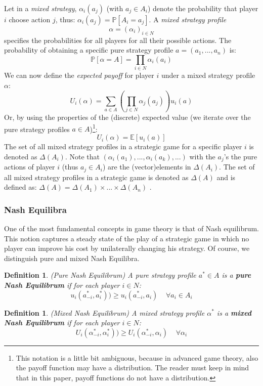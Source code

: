 \documentclass[a4paper,11pt]{article}
\newtheorem{definition}[theorem]{Definition}
\renewcommand{\P}{{\mathbb P}}
\newcommand{\E}{{\mathbb E}}
\begin{document}
Let in a \emph{mixed strategy}, $\alpha_i(a_j)$ (with $a_j \in A_i$) denote the probability that player $i$ choose action $j$, thus: $\alpha_i(a_j) = \P[A_i = a_j]$. A \emph{mixed strategy profile} $$\alpha = \left(\alpha_i\right)_{i\in N}$$ specifies the probabilities for all players for all their possible actions. The probability of obtaining a specific pure strategy profile $a = (a_1,...,a_n)$ is:
$$\P[\alpha = A] = \displaystyle\prod_{i \in N} \alpha_i(a_i)$$
 We can now define the \emph{expected payoff} for player $i$ under a mixed strategy profile $\alpha$:
$$U_i(\alpha) = \displaystyle\sum_{a \in A}{\left(\prod_{j \in N}{\alpha_j(a_j)}\right) u_i(a)}$$
Or, by using the properties of the (discrete) expected value (we iterate over the pure strategy profiles $a \in A$)\footnote[1]{This notation is a little bit ambiguous, because in advanced game theory, also the payoff function may have a distribution. The reader must keep in mind that in this paper, payoff functions do not have a distribution.}:
$$U_i(\alpha) = \E[u_i(a)]$$
The set of all mixed strategy profiles in a strategic game for a specific player $i$ is denoted as $\Delta(A_i)$. Note that $(\alpha_i(a_1),...,\alpha_i(a_k),...)$ with the $a_j$'s the pure actions of player $i$ (thus $a_j \in A_i$) are the (vector)elements in $\Delta(A_i)$. The set of all mixed strategy profiles in a strategic game is denoted as $\Delta(A)$ and is defined as: $\Delta(A) = \Delta(A_1) \times ... \times \Delta(A_n)$ .


\subsubsection{Nash Equilibra}
One of the most fundamental concepts in game theory is that of Nash equilibrum. This notion captures a steady state of the play of a strategic game in which no player can improve his cost by unilaterally changing his strategy. Of course, we distinguish pure and mixed Nash Equilibra.

\begin{definition}(Pure Nash Equilibrum) \cite{6}
A pure strategy profile $a^* \in A$ is a \textbf{pure Nash Equilibrum} if for each player $i\in N$:
$$u_i(a_{-i}^*,a_i^*)) \geq u_i(a_{-i}^*, a_i) \;\;\;\; \forall a_i \in A_i$$
\end{definition}

\begin{definition}(Mixed Nash Equilibrum)\cite{10}
A mixed strategy profile $\alpha^*$ is a \textbf{mixed Nash Equilibrum} if for each player $i \in N$:
$$U_i(\alpha_{-i}^*,\alpha_i^*)) \geq U_i(\alpha_{-i}^*, \alpha_i) \;\;\;\; \forall \alpha_i$$
\end{definition}
\end{document}
